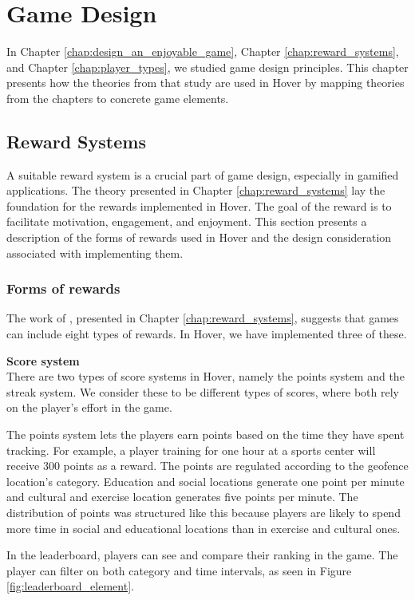 \section{Game Design}
\label{chap:game_design}

In Chapter \ref{chap:design_an_enjoyable_game}, Chapter \ref{chap:reward_systems}, and Chapter \ref{chap:player_types}, we studied game design principles. This chapter presents how the theories from that study are used in Hover by mapping theories from the chapters to concrete game elements.

\subsection{Reward Systems}
A suitable reward system is a crucial part of game design, especially in gamified applications. The theory presented in Chapter \ref{chap:reward_systems} lay the foundation for the rewards implemented in Hover. The goal of the reward is to facilitate motivation, engagement, and enjoyment. This section presents a description of the forms of rewards used in Hover and the design consideration associated with implementing them. 

\subsubsection{Forms of rewards}
The work of \citeauthor{wang_game_2011}, presented in Chapter \ref{chap:reward_systems}, suggests that games can include eight types of rewards. In Hover, we have implemented three of these.

\textbf{Score system} \\
There are two types of score systems in Hover, namely the points system and the streak system. We consider these to be different types of scores, where both rely on the player’s effort in the game.

The points system lets the players earn points based on the time they have spent tracking. For example, a player training for one hour at a sports center will receive 300 points as a reward. The points are regulated according to the geofence location’s category. Education and social locations generate one point per minute and cultural and exercise location generates five points per minute. The distribution of points was structured like this because players are likely to spend more time in social and educational locations than in exercise and cultural ones. 

In the leaderboard, players can see and compare their ranking in the game. The player can filter on both category and time intervals, as seen in Figure \ref{fig:leaderboard_element}.

